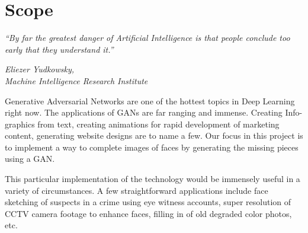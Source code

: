 {\chapter{Scope}\label{ch:scope}}
\epigraph{\textit{\Large “By far the greatest danger of Artificial Intelligence is that people conclude too early that they understand it.”}}{\textit{ \large Eliezer Yudkowsky,\\ Machine Intelligence Research Institute}}
Generative Adversarial Networks are one of the hottest topics in Deep Learning right now. The applications of GANs are far ranging and immense. Creating Info-graphics from text, creating animations for rapid development of marketing content, generating website designs are to name a few. Our focus in this project is to implement a way to complete images of faces by generating the missing pieces using a GAN. 

\par\bigskip
This particular implementation of the technology would be immensely useful in a variety of circumstances. A few straightforward applications include face sketching of suspects in a crime using eye witness accounts, super resolution of CCTV camera footage to enhance faces, filling in of old degraded color photos, etc.
